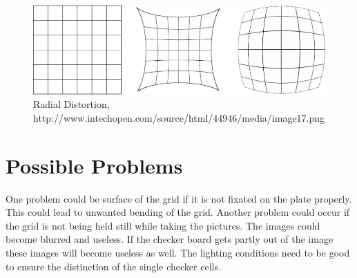 \documentclass[paper=a4, fontsize=11pt]{scrartcl} %
\numberwithin{equation}{section} %
\numberwithin{figure}{section} %
\numberwithin{table}{section} %
\begin{document}
\begin{figure}[H]
	\centering
	\includegraphics[width = 0.6\linewidth]{radial.png}
	\caption{Radial Distortion, \\http://www.intechopen.com/source/html/44946/media/image17.png}
	\label{ref_radial}
\end{figure}

\section{Possible Problems}
One problem could be surface of the grid if it is not fixated on the plate properly. 
This could lead to unwanted bending of the grid.
Another problem could occur if the grid is not being held still while taking the pictures.
The images could become blurred and useless.
If the checker board gets partly out of the image these images will become useless as well.
The lighting conditions need to be good to ensure the distinction of the single checker cells.






\end{document}

